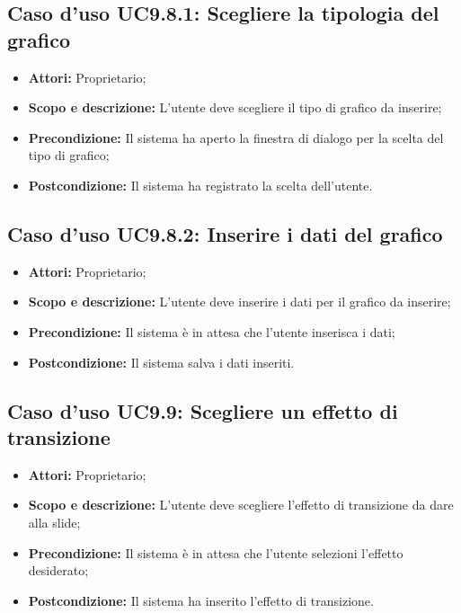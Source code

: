 	\subsection{Caso d'uso UC9.8.1: Scegliere la tipologia del grafico}
	\begin{itemize}
		\item \textbf{Attori:} Proprietario;
		\item \textbf{Scopo e descrizione:} L'utente deve scegliere il tipo di grafico da inserire;
		\item \textbf{Precondizione:} Il sistema ha aperto la finestra di dialogo per la scelta del tipo di grafico;
		\item \textbf{Postcondizione:} Il sistema ha registrato la scelta dell'utente.
	\end{itemize}
	
	\subsection{Caso d'uso UC9.8.2: Inserire i dati del grafico}
	\begin{itemize}
		\item \textbf{Attori:} Proprietario;
		\item \textbf{Scopo e descrizione:} L'utente deve inserire i dati per il grafico da inserire;
		\item \textbf{Precondizione:} Il sistema è in attesa che l'utente inserisca i dati;
		\item \textbf{Postcondizione:} Il sistema salva i dati inseriti.
	\end{itemize}


\subsection{Caso d'uso UC9.9: Scegliere un effetto di transizione}
\begin{itemize}
	\item \textbf{Attori:} Proprietario;
	\item \textbf{Scopo e descrizione:} L'utente deve scegliere l'effetto di transizione da dare alla \gls{slide};
	\item \textbf{Precondizione:} Il sistema è in attesa che l'utente selezioni l'effetto desiderato;
	\item \textbf{Postcondizione:} Il sistema ha inserito l'effetto di transizione.
\end{itemize}


